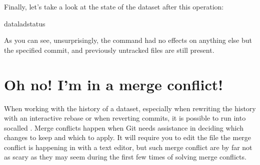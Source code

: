 \sphinxAtStartPar
Finally, let’s take a look at the state of the dataset after this operation:

\begin{sphinxVerbatim}[commandchars=\\\{\}]
dataladstatus
\end{sphinxVerbatim}

\sphinxAtStartPar
As you can see, unsurprisingly, the  command had no
effects on anything else but the specified commit, and previously untracked
files are still present.

\ignorespaces 

\section{Oh no! I’m in a merge conflict!}
\label{\detokenize{basics/101-137-history:oh-no-i-m-in-a-merge-conflict}}\label{\detokenize{basics/101-137-history:index-8}}
\sphinxAtStartPar
When working with the history of a dataset, especially when rewriting
the history with an interactive rebase or when reverting commits, it is
possible to run into so\sphinxhyphen{}called .
Merge conflicts happen when Git needs assistance in deciding
which changes to keep and which to apply. It will require
you to edit the file the merge conflict is happening in with
a text editor, but such merge conflict are by far not as scary as
they may seem during the first few times of solving merge conflicts.

